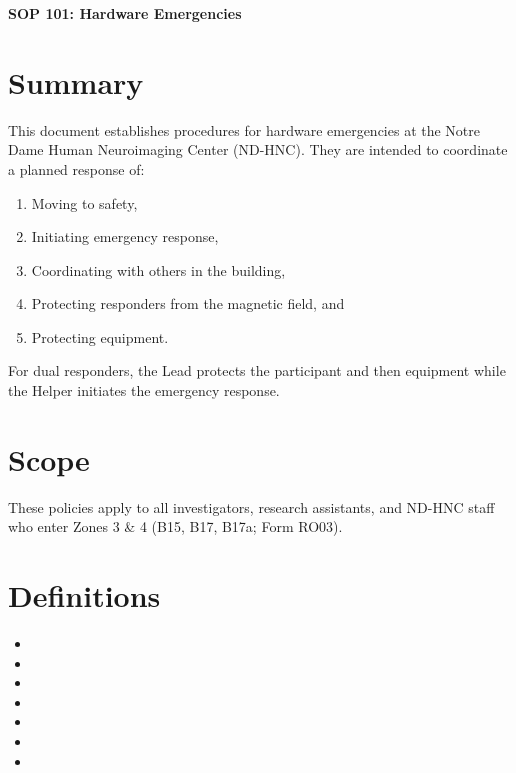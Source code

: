 \documentclass[11pt]{article}
\begin{document}
\renewcommand{\labelenumii}{\arabic{enumi}.\arabic{enumii}}
\renewcommand{\labelenumiii}{\arabic{enumi}.\arabic{enumii}.\arabic{enumiii}}
\renewcommand{\labelenumiv}{\arabic{enumi}.\arabic{enumii}.\arabic{enumiii}.\arabic{enumiv}}

\begin{center}
	\textbf{\Large SOP 101: Hardware Emergencies}\\
	\hrulefill
\end{center}


\section{Summary}
This document establishes procedures for hardware emergencies at the Notre Dame Human Neuroimaging Center (ND-HNC). They are intended to coordinate a planned response of:

\begin{enumerate}
	\item Moving to safety,
	\item Initiating emergency response,
	\item Coordinating with others in the building,
	\item Protecting responders from the magnetic field, and
	\item Protecting equipment.
\end{enumerate}

For dual responders, the Lead protects the participant and then equipment while the Helper initiates the emergency response.

\section{Scope}
These policies apply to all investigators, research assistants, and ND-HNC staff who enter Zones 3 \& 4 (B15, B17, B17a; Form RO03).

\section{Definitions}

\begin{itemize}
	\item \ControlRoom
	\item \ElectronicLock
	\item \EquipmentRoom
	\item \Helper
	\item \Lead
	\item \MagnetRoom
	\item \Visitor
\end{itemize}
\end{document}
